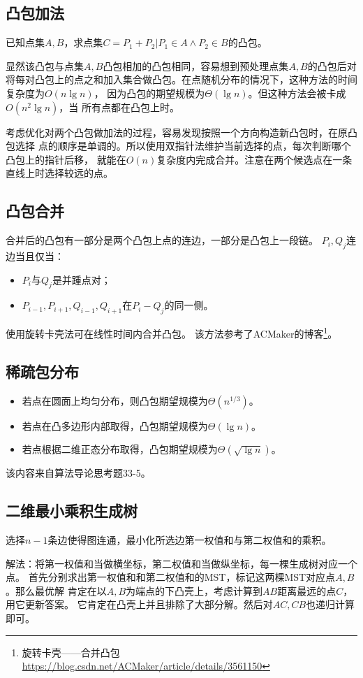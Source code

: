 \subsection{凸包加法}
已知点集$A,B$，求点集$C={P_1+P_2|P_1\in A \land P_2\in B}$的凸包。

显然该凸包与点集$A,B$凸包相加的凸包相同，容易想到预处理点集$A,B$的凸包后对
将每对凸包上的点之和加入集合做凸包。在点随机分布的情况下，这种方法的时间复杂度为$O(n \lg n)$，
因为凸包的期望规模为$\Theta(\lg n)$。但这种方法会被卡成$O(n^2 \lg n)$，当
所有点都在凸包上时。

考虑优化对两个凸包做加法的过程，容易发现按照一个方向构造新凸包时，在原凸包选择
点的顺序是单调的。所以使用双指针法维护当前选择的点，每次判断哪个凸包上的指针后移，
就能在$O(n)$复杂度内完成合并。注意在两个候选点在一条直线上时选择较远的点。
\subsection{凸包合并}
合并后的凸包有一部分是两个凸包上点的连边，一部分是凸包上一段链。
$P_i,Q_j$连边当且仅当：
\begin{itemize}
	\item $P_i$与$Q_j$是并踵点对；
	\item $P_{i-1},P_{i+1},Q_{i-1},Q_{i+1}$在$P_i-Q_j$的同一侧。
\end{itemize}
使用旋转卡壳法可在线性时间内合并凸包。
该方法参考了ACMaker的博客\footnote{
	旋转卡壳——合并凸包
	\url{https://blog.csdn.net/ACMaker/article/details/3561150}
}。
\subsection{稀疏包分布}
\begin{itemize}
	\item 若点在圆面上均匀分布，则凸包期望规模为$\Theta(n^{1/3})$。
	\item 若点在凸多边形内部取得，凸包期望规模为$\Theta(\lg n)$。
	\item 若点根据二维正态分布取得，凸包期望规模为$\Theta(\sqrt{\lg n})$。
\end{itemize}
该内容来自算法导论\cite{ITA3}思考题33-5。
\subsection{二维最小乘积生成树}
选择$n-1$条边使得图连通，最小化所选边第一权值和与第二权值和的乘积。

解法：将第一权值和当做横坐标，第二权值和当做纵坐标，每一棵生成树对应一个点。
首先分别求出第一权值和和第二权值和的MST，标记这两棵MST对应点$A,B$。那么最优解
肯定在以$A,B$为端点的下凸壳上，考虑计算到$AB$距离最远的点$C$，用它更新答案。
它肯定在凸壳上并且排除了大部分解。然后对$AC,CB$也递归计算即可。

